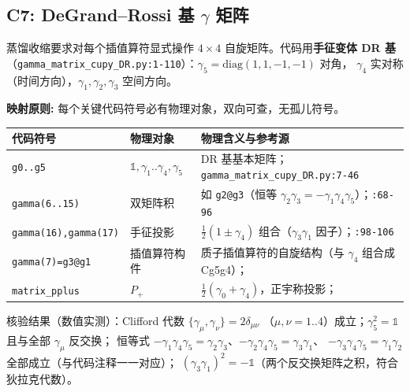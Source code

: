 \documentclass[UTF8]{ctexart}
\begin{document}
\subsection{C7: DeGrand--Rossi 基 $\gamma$ 矩阵}
蒸馏收缩要求对每个插值算符显式操作 $4\times 4$ 自旋矩阵。代码用\textbf{手征变体 DR 基}
（\texttt{\nolinkurl{gamma_matrix_cupy_DR.py:1-110}}）：$\gamma_5=\mathrm{diag}(1,1,-1,-1)$ 对角，
$\gamma_4$ 实对称（时间方向），$\gamma_1,\gamma_2,\gamma_3$ 空间方向。

\begin{mapbox}
\textbf{映射原则:} 每个关键代码符号必有物理对象，双向可查，无孤儿符号。
\end{mapbox}
\begin{xltabular}{\textwidth}{llX}
\toprule
\textcolor{map}{代码符号} & 物理对象 & 物理含义与参考源 \\
\midrule
\endhead
\texttt{g0..g5} & $\mathbb 1,\gamma_1..\gamma_4,\gamma_5$ & DR 基基本矩阵；\texttt{\nolinkurl{gamma_matrix_cupy_DR.py:7-46}} \\
\texttt{gamma(6..15)} & 双矩阵积 & 如 \texttt{g2@g3}（恒等 $\gamma_2\gamma_3=-\gamma_1\gamma_4\gamma_5$）；\texttt{\nolinkurl{:68-96}} \\
\texttt{gamma(16),gamma(17)} & 手征投影 & $\tfrac12(1\pm\gamma_4)$ 组合（$\gamma_3\gamma_1$ 因子）；\texttt{\nolinkurl{:98-106}} \\
\texttt{gamma(7)=g3@g1} & 插值算符构件 & 质子插值算符的自旋结构（与 $\gamma_4$ 组合成 Cg5g4）；\\
\texttt{matrix\_pplus} & $P_+$ & $\tfrac12(\gamma_0+\gamma_4)$，正宇称投影；\\
\bottomrule
\end{xltabular}



\textcolor{evidence}{核验结果（数值实测）}：Clifford 代数 $\{\gamma_\mu,\gamma_\nu\}=2\delta_{\mu\nu}$
（$\mu,\nu=1..4$）成立；$\gamma_5^2=\mathbb 1$ 且与全部 $\gamma_\mu$ 反交换；
恒等式 $-\gamma_1\gamma_4\gamma_5=\gamma_2\gamma_3$、$-\gamma_2\gamma_4\gamma_5=\gamma_3\gamma_1$、
$-\gamma_3\gamma_4\gamma_5=\gamma_1\gamma_2$ 全部成立（与代码注释一一对应）；
$(\gamma_3\gamma_1)^2=-\mathbb 1$（两个反交换矩阵之积，符合狄拉克代数）。
\end{document}
